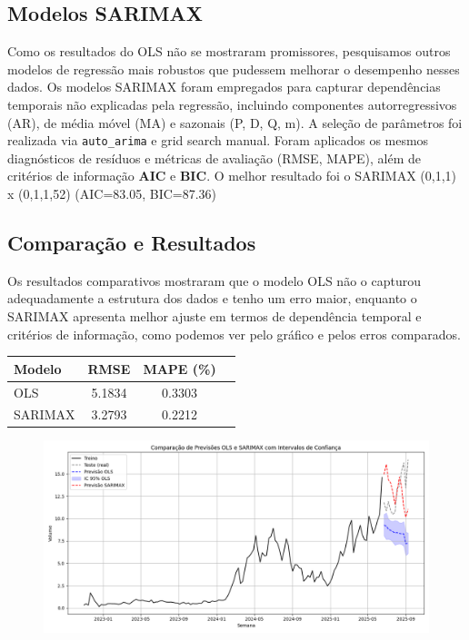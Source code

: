 \documentclass{article}
\begin{document}
\subsection*{Modelos SARIMAX}
Como os resultados do OLS não se mostraram promissores, pesquisamos outros modelos de regressão mais robustos que pudessem melhorar o desempenho nesses dados. Os modelos SARIMAX foram empregados para capturar dependências temporais não explicadas pela regressão, incluindo componentes autorregressivos (AR), de média móvel (MA) e sazonais (P, D, Q, m).  
A seleção de parâmetros foi realizada via \texttt{auto\_arima} e grid search manual. Foram aplicados os mesmos diagnósticos de resíduos e métricas de avaliação (RMSE, MAPE), além de critérios de informação \textbf{AIC} e \textbf{BIC}. O melhor resultado foi
o SARIMAX (0,1,1) x (0,1,1,52) (AIC=83.05, BIC=87.36)

\subsection*{Comparação e Resultados}
Os resultados comparativos mostraram que o modelo OLS não o  capturou adequadamente a estrutura dos dados e tenho um erro maior, enquanto o SARIMAX apresenta melhor ajuste em termos de dependência temporal e critérios de informação, como podemos ver pelo gráfico e pelos erros comparados.  

\begin{table}[h]
    \centering
    \begin{tabular}{|l|c|c|c|}
        \hline
        \textbf{Modelo}  & \textbf{RMSE} & \textbf{MAPE (\%)} \\
        \hline
        OLS & 5.1834 & 0.3303 \\
        SARIMAX  & 3.2793 & 0.2212 \\
        \hline
    \end{tabular}
    \label{tab:baseline_results}
\end{table}

\begin{figure}[h]
    \centering
    \includegraphics[width=0.75\linewidth]{images/forecast_comparison.png}
\end{figure}
\end{document}
